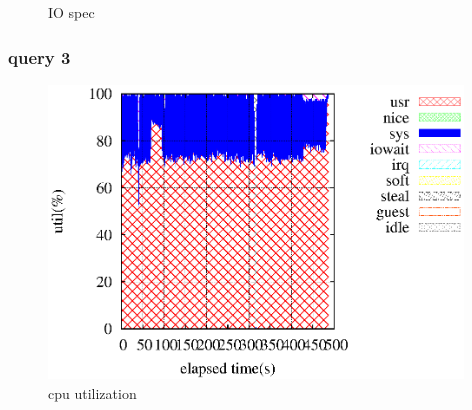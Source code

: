 \documentclass[11pt,a4paper]{jsarticle}
\newlength{\subfigwidth}
\newlength{\subfigcolsep}
\begin{document}
\begin{figure}[thbp]
 \setlength{\subfigwidth}{.5\linewidth}
 \addtolength{\subfigwidth}{-.5\subfigcolsep}
 \begin{minipage}[b]{\subfigwidth}
 \end{minipage}
  \begin{minipage}[b]{\subfigwidth}
  \end{minipage}
  \caption{IO spec}
  \label{fig:7}
\end{figure}

\clearpage
\subsubsection*{query 3}
\begin{figure}[thbp]
 \begin{center}
  \includegraphics[width=110mm]{swapoff3core1.eps}
 \end{center}
 \caption{cpu utilization}
 \label{fig:8cpu}
\end{figure}
\end{document}
